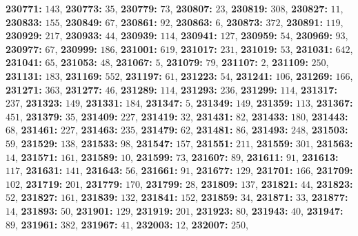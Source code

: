 \textsf{\bfseries 230771:} $143$, \textsf{\bfseries 230773:} $35$, \textsf{\bfseries 230779:} $73$, \textsf{\bfseries 230807:} $23$, \textsf{\bfseries 230819:} $308$, \textsf{\bfseries 230827:} $11$, \textsf{\bfseries 230833:} $155$, \textsf{\bfseries 230849:} $67$, \textsf{\bfseries 230861:} $92$, \textsf{\bfseries 230863:} $6$, \textsf{\bfseries 230873:} $372$, \textsf{\bfseries 230891:} $119$, \textsf{\bfseries 230929:} $217$, \textsf{\bfseries 230933:} $44$, \textsf{\bfseries 230939:} $114$, \textsf{\bfseries 230941:} $127$, \textsf{\bfseries 230959:} $54$, \textsf{\bfseries 230969:} $93$, \textsf{\bfseries 230977:} $67$, \textsf{\bfseries 230999:} $186$, \textsf{\bfseries 231001:} $619$, \textsf{\bfseries 231017:} $231$, \textsf{\bfseries 231019:} $53$, \textsf{\bfseries 231031:} $642$, \textsf{\bfseries 231041:} $65$, \textsf{\bfseries 231053:} $48$, \textsf{\bfseries 231067:} $5$, \textsf{\bfseries 231079:} $79$, \textsf{\bfseries 231107:} $2$, \textsf{\bfseries 231109:} $250$, \textsf{\bfseries 231131:} $183$, \textsf{\bfseries 231169:} $552$, \textsf{\bfseries 231197:} $61$, \textsf{\bfseries 231223:} $54$, \textsf{\bfseries 231241:} $106$, \textsf{\bfseries 231269:} $166$, \textsf{\bfseries 231271:} $363$, \textsf{\bfseries 231277:} $46$, \textsf{\bfseries 231289:} $114$, \textsf{\bfseries 231293:} $236$, \textsf{\bfseries 231299:} $114$, \textsf{\bfseries 231317:} $237$, \textsf{\bfseries 231323:} $149$, \textsf{\bfseries 231331:} $184$, \textsf{\bfseries 231347:} $5$, \textsf{\bfseries 231349:} $149$, \textsf{\bfseries 231359:} $113$, \textsf{\bfseries 231367:} $451$, \textsf{\bfseries 231379:} $35$, \textsf{\bfseries 231409:} $227$, \textsf{\bfseries 231419:} $32$, \textsf{\bfseries 231431:} $82$, \textsf{\bfseries 231433:} $180$, \textsf{\bfseries 231443:} $68$, \textsf{\bfseries 231461:} $227$, \textsf{\bfseries 231463:} $235$, \textsf{\bfseries 231479:} $62$, \textsf{\bfseries 231481:} $86$, \textsf{\bfseries 231493:} $248$, \textsf{\bfseries 231503:} $59$, \textsf{\bfseries 231529:} $138$, \textsf{\bfseries 231533:} $98$, \textsf{\bfseries 231547:} $157$, \textsf{\bfseries 231551:} $211$, \textsf{\bfseries 231559:} $301$, \textsf{\bfseries 231563:} $14$, \textsf{\bfseries 231571:} $161$, \textsf{\bfseries 231589:} $10$, \textsf{\bfseries 231599:} $73$, \textsf{\bfseries 231607:} $89$, \textsf{\bfseries 231611:} $91$, \textsf{\bfseries 231613:} $117$, \textsf{\bfseries 231631:} $141$, \textsf{\bfseries 231643:} $56$, \textsf{\bfseries 231661:} $91$, \textsf{\bfseries 231677:} $129$, \textsf{\bfseries 231701:} $166$, \textsf{\bfseries 231709:} $102$, \textsf{\bfseries 231719:} $201$, \textsf{\bfseries 231779:} $170$, \textsf{\bfseries 231799:} $28$, \textsf{\bfseries 231809:} $137$, \textsf{\bfseries 231821:} $44$, \textsf{\bfseries 231823:} $52$, \textsf{\bfseries 231827:} $161$, \textsf{\bfseries 231839:} $132$, \textsf{\bfseries 231841:} $152$, \textsf{\bfseries 231859:} $34$, \textsf{\bfseries 231871:} $33$, \textsf{\bfseries 231877:} $14$, \textsf{\bfseries 231893:} $50$, \textsf{\bfseries 231901:} $129$, \textsf{\bfseries 231919:} $201$, \textsf{\bfseries 231923:} $80$, \textsf{\bfseries 231943:} $40$, \textsf{\bfseries 231947:} $89$, \textsf{\bfseries 231961:} $382$, \textsf{\bfseries 231967:} $41$, \textsf{\bfseries 232003:} $12$, \textsf{\bfseries 232007:} $250$, 
